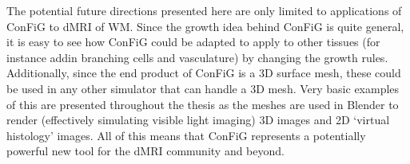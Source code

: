 The potential future directions presented here are only limited to applications of \ac{ConFiG} to \ac{dMRI} of \ac{WM}. Since the growth idea behind \ac{ConFiG} is quite general, it is easy to see how \ac{ConFiG} could be adapted to apply to other tissues (for instance addin branching cells and vasculature) by changing the growth rules.
Additionally, since the end product of \ac{ConFiG} is a 3D surface mesh, these could be used in any other simulator that can handle a 3D mesh. Very basic examples of this are presented throughout the thesis as the meshes are used in Blender to render (effectively simulating visible light imaging) 3D images and 2D `virtual histology' images.
All of this means that \ac{ConFiG} represents a potentially powerful new tool for the \ac{dMRI} community and beyond.


